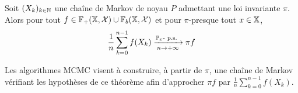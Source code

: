 \documentclass[10pt,a4paper]{article}
\begin{document}


\begin{Thm}\label{thm:ergodic}
  Soit $(X_k)_{k \in \mathbb{N}}$ une chaîne de Markov de noyau $P$ admettant une loi invariante $\pi$. Alors pour tout $f \in \mathbb{F}_+(\mathbb{X}, \mathcal{X}) \cup \mathbb{F}_b(\mathbb{X}, \mathcal{X})$ et pour $\pi$-presque tout $x \in \mathbb{X}$,
  $$\frac{1}{n} \sum_{k=0}^{n-1} f(X_k) \xrightarrow[n \to +\infty]{\PP_x\text{-}\ps} \pi f$$
\end{Thm}

Les algorithmes MCMC visent à construire, à partir de $\pi$, une chaîne de Markov vérifiant les hypothèses de ce théorème afin d'approcher $\pi f$ par $\frac{1}{n} \sum_{k=0}^{n-1} f(X_k)$.
\end{document}
